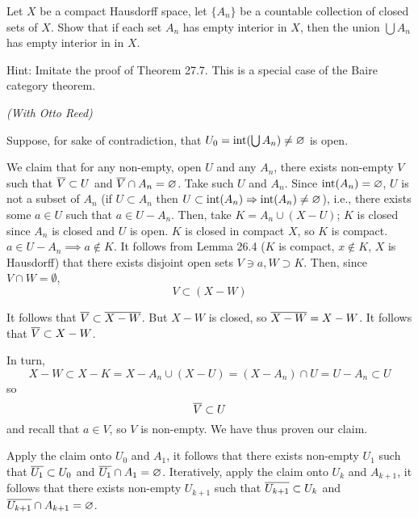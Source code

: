 \documentclass[a4paper, 12pt]{article}
\begin{document}
\begin{problem} 
    Let $X$ be a compact Hausdorff space, let $\{A_n\}$ be a countable collection of closed sets of $X$. Show that if each set $A_n$ has empty interior in $X$, then the union $\bigcup A_n$ has empty interior in in $X$.

    Hint: Imitate the proof of Theorem 27.7. This is a special case of the Baire category theorem.
\end{problem}
\begin{solution}
    \textit{(With Otto Reed)}

    Suppose, for sake of contradiction, that $U_0 = \operatorname*{int} (\bigcup A_n) \neq \varnothing$ is open.

    We claim that for any non-empty, open $U$ and any $A_n$, there exists non-empty $V$ such that $\overline{V} \subset U$ and $\overline{V} \cap A_n = \varnothing$. Take such $U$ and $A_n$. Since $\operatorname*{int} (A_n) = \varnothing$, $U$ is not a subset of $A_n$ (if $U \subset A_n$ then $U \subset \operatorname*{int}(A_n) \Rightarrow \operatorname*{int}(A_n) \neq \varnothing$), i.e., there exists some $a \in U$ such that $a \in U - A_n$. Then, take $K = A_n \cup (X - U)$; $K$ is closed since $A_n$ is closed and $U$ is open. $K$ is closed in compact $X$, so $K$ is compact. $a \in U - A_n \implies a \not \in K$. It follows from Lemma 26.4 ($K$ is compact, $x \not \in K$, $X$ is Hausdorff) that there exists disjoint open sets $V \ni a, W \supset K$. Then, since $V \cap W = \emptyset$, \begin{equation*}
    V \subset (X - W)
    \end{equation*}

    It follows that $\overline{V} \subset \overline{X - W}$. But $X - W$ is closed, so $\overline{X - W} = X - W$. It follows that $\overline{V} \subset X - W$.

    In turn, \begin{equation*}
    X - W \subset X - K = X - A_n \cup (X - U) = (X - A_n) \cap U = U - A_n \subset U
    \end{equation*}
    so \begin{equation*}
    \overline{V} \subset U
    \end{equation*}
    and recall that $a \in V$, so $V$ is non-empty. We have thus proven our claim.

    Apply the claim onto $U_0$ and $A_1$, it follows that there exists non-empty $U_1$ such that $\overline{U_1} \subset U_0$ and $\overline{U_1} \cap A_1 = \varnothing$. Iteratively, apply the claim onto $U_k$ and $A_{k+1}$, it follows that there exists non-empty $U_{k+1}$ such that $\overline{U_{k+1}} \subset U_k$ and $\overline{U_{k+1}} \cap A_{k+1} = \varnothing$.


\end{solution}
\end{document}
